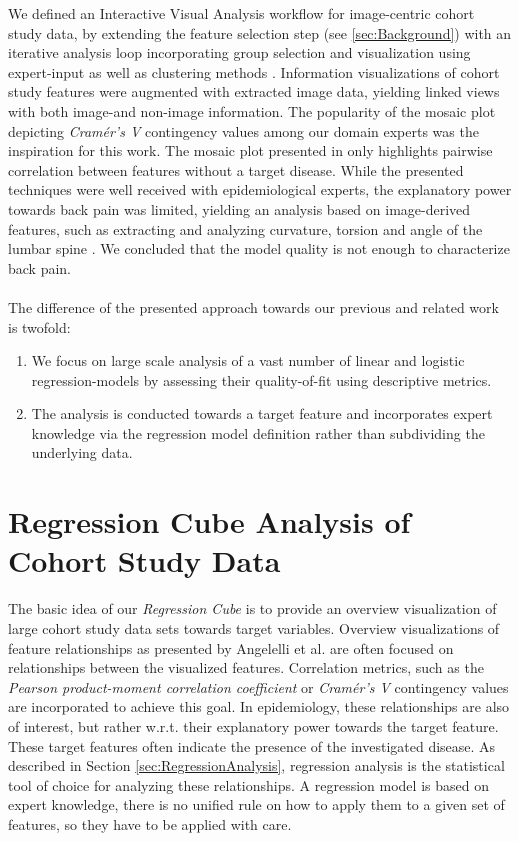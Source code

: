 \documentclass[journal]{style/vgtc} 			          %
\newcommand{\com}[1]{\textcolor{orange}{\uline{#1}}}
\begin{document}
We defined an Interactive Visual Analysis workflow for image-centric cohort study data, by extending the feature selection step (see \ref{sec:Background}) with an iterative analysis loop incorporating group selection and visualization using expert-input as well as clustering methods \cite{Klemm2014VIS}.
Information visualizations of cohort study features were augmented with extracted image data, yielding linked views with both image-and non-image information.
The popularity of the mosaic plot depicting \emph{Cram\'{e}r's V} contingency values among our domain experts was the inspiration for this work.
The mosaic plot presented in \cite{Klemm2014VIS} only highlights pairwise correlation between features without a target disease.
While the presented techniques were well received with epidemiological experts, the explanatory power towards back pain was limited, yielding an analysis based on image-derived features, such as extracting and analyzing curvature, torsion and angle of the lumbar spine \cite{Klemm2015}.
We concluded that the model quality is not enough to characterize back pain.
\\\\
The difference of the presented approach towards our previous and related work is twofold:
\begin{enumerate}
	\item We focus on large scale analysis of a vast number of linear and logistic regression-models by assessing their quality-of-fit using descriptive metrics.
	\item The analysis is conducted towards a target feature and incorporates expert knowledge via the regression model definition rather than subdividing the underlying data.
\end{enumerate}
\section{Regression Cube Analysis of Cohort Study Data}
The basic idea of our \emph{Regression Cube} is to provide an overview visualization of large cohort study data sets towards target variables.
Overview visualizations of feature relationships as presented by Angelelli et al. \cite{Angelelli} are often focused on relationships between the visualized features.
Correlation metrics, such as the \emph{Pearson product-moment correlation coefficient} or \emph{Cram\'{e}r's V} contingency values are incorporated to achieve this goal.
In epidemiology, these relationships are also of interest, but rather w.r.t. their explanatory power towards the target feature.
These target features often indicate the presence of the investigated disease.
As described in Section \ref{sec:RegressionAnalysis}, regression analysis is the statistical tool of choice for analyzing these relationships.
A regression model is based on expert knowledge, there is no unified rule on how to apply them to a given set of features, so they have to be applied with care.
\end{document}
